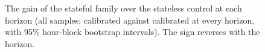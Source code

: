 \begin{figure}[t]
\centering

\caption{The gain of the stateful family over the stateless control at each horizon
(all samples; calibrated against calibrated at every horizon, with 95\% hour-block
bootstrap intervals).  The sign reverses with the horizon.}
\label{fig:horizons:synthesis}
\end{figure}








